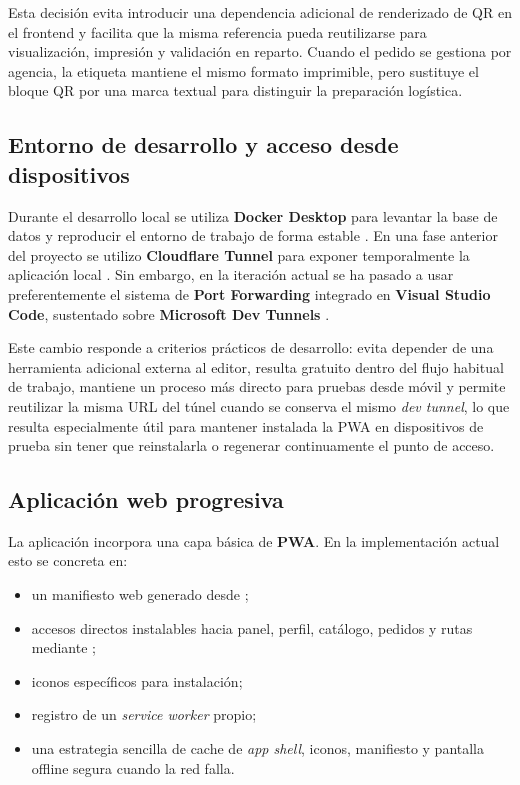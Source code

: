 Esta decisión evita introducir una dependencia adicional de renderizado de QR en el frontend y facilita que la misma referencia pueda reutilizarse para visualización, impresión y validación en reparto. Cuando el pedido se gestiona por agencia, la etiqueta mantiene el mismo formato imprimible, pero sustituye el bloque QR por una marca textual para distinguir la preparación logística.

\subsection{Entorno de desarrollo y acceso desde dispositivos}

Durante el desarrollo local se utiliza \textbf{Docker Desktop} para levantar la base de datos y reproducir el entorno de trabajo de forma estable \citep{dockerdocs2026}. En una fase anterior del proyecto se utilizo \textbf{Cloudflare Tunnel} para exponer temporalmente la aplicación local \citep{cloudflaretunnel2026}. Sin embargo, en la iteración actual se ha pasado a usar preferentemente el sistema de \textbf{Port Forwarding} integrado en \textbf{Visual Studio Code}, sustentado sobre \textbf{Microsoft Dev Tunnels} \citep{vscodeportforwarding2026,microsoftdevtunnelsfaq2026}.

Este cambio responde a criterios prácticos de desarrollo: evita depender de una herramienta adicional externa al editor, resulta gratuito dentro del flujo habitual de trabajo, mantiene un proceso más directo para pruebas desde móvil y permite reutilizar la misma URL del túnel cuando se conserva el mismo \textit{dev tunnel}, lo que resulta especialmente útil para mantener instalada la PWA en dispositivos de prueba sin tener que reinstalarla o regenerar continuamente el punto de acceso.

\subsection{Aplicación web progresiva}

La aplicación incorpora una capa básica de \textbf{PWA}. En la implementación actual esto se concreta en:

\begin{itemize}
    \item un manifiesto web generado desde ;
    \item accesos directos instalables hacia panel, perfil, catálogo, pedidos y rutas mediante ;
    \item iconos específicos para instalación;
    \item registro de un \textit{service worker} propio;
    \item una estrategia sencilla de cache de \textit{app shell}, iconos, manifiesto y pantalla offline segura cuando la red falla.
\end{itemize}

